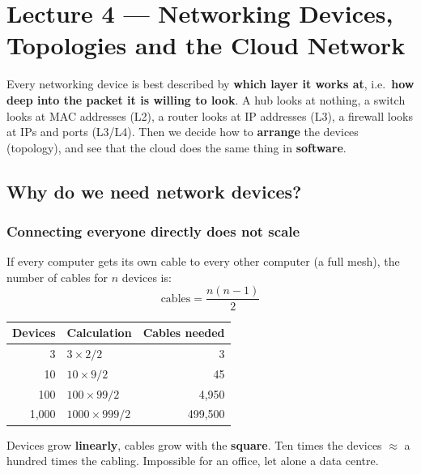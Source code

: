 \chapter{Lecture 4 --- Networking Devices, Topologies and the Cloud Network}

\begin{keyidea}
Every networking device is best described by \textbf{which layer it works at}, i.e.\ \textbf{how deep into the packet it is willing to look}. A hub looks at nothing, a switch looks at MAC addresses (L2), a router looks at IP addresses (L3), a firewall looks at IPs and ports (L3/L4). Then we decide how to \textbf{arrange} the devices (topology), and see that the cloud does the same thing in \textbf{software}.
\end{keyidea}

\section{Why do we need network devices?}

\subsection{Connecting everyone directly does not scale}
If every computer gets its own cable to every other computer (a full mesh), the number of cables for $n$ devices is:
\[ \text{cables} = \frac{n(n-1)}{2} \]

\begin{center}
\begin{tabular}{rlr}
\toprule
Devices & Calculation & Cables needed \\
\midrule
3 & $3\times 2/2$ & 3 \\
10 & $10\times 9/2$ & 45 \\
100 & $100\times 99/2$ & 4{,}950 \\
1{,}000 & $1000\times 999/2$ & 499{,}500 \\
\bottomrule
\end{tabular}
\end{center}
Devices grow \textbf{linearly}, cables grow with the \textbf{square}. Ten times the devices $\approx$ a hundred times the cabling. Impossible for an office, let alone a data centre.

